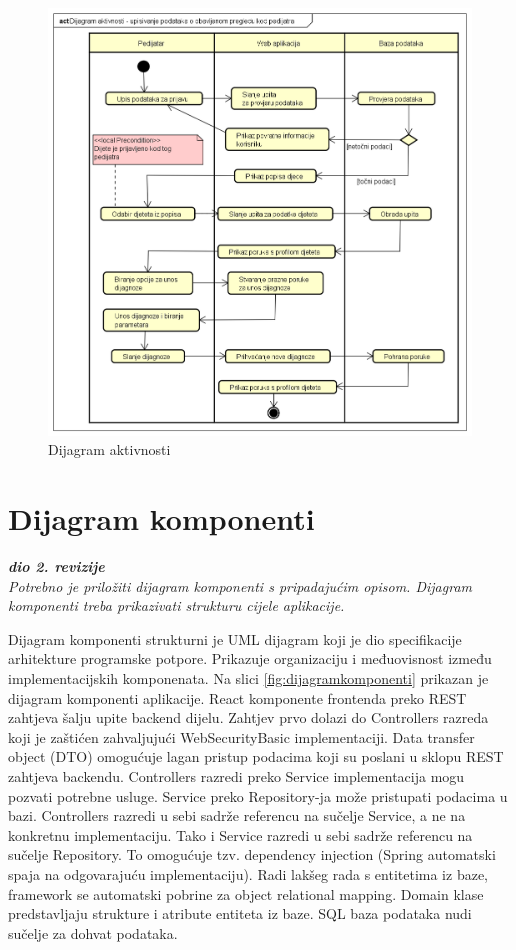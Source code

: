 			 \begin{figure}[H]
			 	\includegraphics[width=\textwidth]{dijagrami/Dijagram aktivnosti.PNG} %
			 	\caption{Dijagram aktivnosti}
			 	\label{fig:dijagramaktivnosti} %
			 \end{figure}
			
			\eject
		\section{Dijagram komponenti}
		
			\textbf{\textit{dio 2. revizije}}\\
		
			 \textit{Potrebno je priložiti dijagram komponenti s pripadajućim opisom. Dijagram komponenti treba prikazivati strukturu cijele aplikacije.}
			 
			 Dijagram komponenti strukturni je UML dijagram koji je dio specifikacije arhitekture programske potpore. Prikazuje organizaciju i međuovisnost između implementacijskih komponenata. Na slici \ref{fig:dijagramkomponenti} prikazan je dijagram komponenti aplikacije. React komponente frontenda preko REST zahtjeva šalju upite backend dijelu. Zahtjev prvo dolazi do Controllers razreda koji je zaštićen zahvaljujući WebSecurityBasic implementaciji. Data transfer object (DTO) omogućuje lagan pristup podacima koji su poslani u sklopu REST zahtjeva backendu. Controllers razredi preko Service implementacija mogu pozvati potrebne usluge. Service preko Repository-ja može pristupati podacima u bazi. Controllers razredi u sebi sadrže referencu na sučelje Service, a ne na konkretnu implementaciju. Tako i Service razredi u sebi sadrže referencu na sučelje Repository. To omogućuje tzv. dependency injection (Spring automatski spaja na odgovarajuću implementaciju). Radi lakšeg rada s entitetima iz baze, framework se automatski pobrine za object relational mapping. Domain klase predstavljaju strukture i atribute entiteta iz baze. SQL baza podataka nudi sučelje za dohvat podataka.
			 
